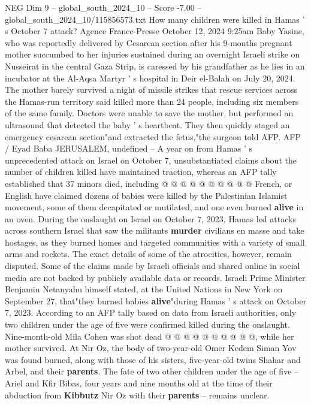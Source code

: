 \begin{textsample}{NEG Dim 9 – global\_south\_2024\_10 – Score -7.00 – global\_south\_2024\_10/115856573.txt}  \label{ex:f9_neg_272}
How many children were killed in Hamas ' s October 7 attack?
Agence France-Presse October 12, 2024 9:25am Baby Yasine, who was reportedly delivered by Cesarean section after his 9-months pregnant mother succumbed to her injuries sustained during an overnight Israeli strike on Nusseirat in the central Gaza Strip, is caressed by his grandfather as he lies in an incubator at the Al-Aqsa Martyr ' s hospital in Deir el-Balah on July 20, 2024.
The mother barely survived a night of missile strikes that rescue services across the Hamas-run territory said killed more than 24 people, including six members of the same family.
Doctors were unable to save the mother, but performed an ultrasound that detected the baby ' s heartbeat.
They then quickly staged an emergency cesarean section"and extracted the fetus,"the surgeon told AFP.
AFP / Eyad Baba JERUSALEM, undefined -- A year on from Hamas ' s unprecedented attack on Israel on October 7, unsubstantiated claims about the number of children killed have maintained traction, whereas an AFP tally established that 37 minors died, including @ @ @ @ @ @ @ @ @ @ French, or English have claimed dozens of babies were killed by the Palestinian Islamist movement, some of them decapitated or mutilated, and one even burned \textbf{alive} in an oven.
During the onslaught on Israel on October 7, 2023, Hamas led attacks across southern Israel that saw the militants \textbf{murder} civilians en masse and take hostages, as they burned homes and targeted communities with a variety of small arms and rockets.
The exact details of some of the atrocities, however, remain disputed.
Some of the claims made by Israeli officials and shared online in social media are not backed by publicly available data or records.
Israeli Prime Minister Benjamin Netanyahu himself stated, at the United Nations in New York on September 27, that"they burned babies \textbf{alive}"during Hamas ' s attack on October 7, 2023.
According to an AFP tally based on data from Israeli authorities, only two children under the age of five were confirmed killed during the onslaught.
Nine-month-old Mila Cohen was shot dead @ @ @ @ @ @ @ @ @ @, while her mother survived.
At Nir Oz, the body of two-year-old Omer Kedem Siman Yov was found burned, along with those of his sisters, five-year-old twins Shahar and Arbel, and their \textbf{parents}.
The fate of two other children under the age of five -- Ariel and Kfir Bibas, four years and nine months old at the time of their abduction from \textbf{Kibbutz} Nir Oz with their \textbf{parents} -- remains unclear.

\end{textsample}

